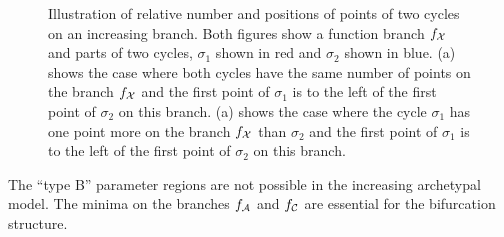 \begin{figure}
	\centering
	 \quad
	\caption[Illustration of relative number and positions of points of two cycles on an increasing branch]{
		Illustration of relative number and positions of points of two cycles on an increasing branch.
		Both figures show a function branch $f_{\mathcal{X}}$ and parts of two cycles, $\sigma_1$ shown in red and $\sigma_2$ shown in blue.
		(a) shows the case where both cycles have the same number of points on the branch $f_{\mathcal{X}}$ and the first point of $\sigma_1$ is to the left of the first point of $\sigma_2$ on this branch.
		(a) shows the case where the cycle $\sigma_1$ has one point more on the branch $f_{\mathcal{X}}$ than $\sigma_2$ and the first point of $\sigma_1$ is to the left of the first point of $\sigma_2$ on this branch.
	}
	\label{fig:add.change.increasing}
\end{figure}

\begin{theorem}
	The ``type B'' parameter regions are not possible in the increasing archetypal model.
	The minima on the branches $f_{\mathcal{A}}$ and $f_{\mathcal{C}}$ are essential for the bifurcation structure.
\end{theorem}


